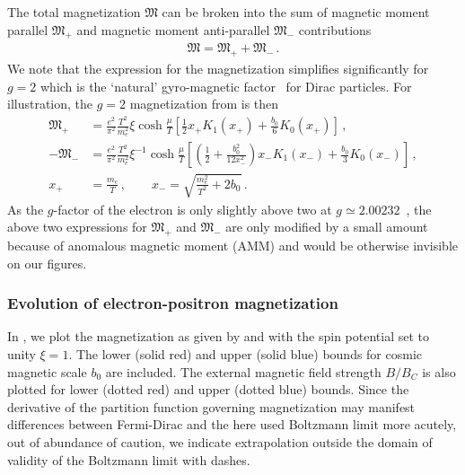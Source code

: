 The total magnetization ${\mathfrak M}$ can be broken into the sum of magnetic moment parallel ${\mathfrak M}_{+}$ and magnetic moment anti-parallel ${\mathfrak M}_{-}$ contributions
\begin{align}
\label{g2mag}
{\mathfrak M}={\mathfrak M}_{+}+{\mathfrak M}_{-}\,.
\end{align}
We note that the expression for the magnetization simplifies significantly for $g\!=\!2$ which is the `natural' gyro-magnetic factor~\cite{Evans:2022fsu,Rafelski:2022bsv} for Dirac particles. For illustration, the $g\!=\!2$ magnetization from  is then
\begin{align}
 \label{g2magplus}
 {\mathfrak M}_{+}&=\frac{e^{2}}{\pi^{2}}\frac{T^{2}}{m_{e}^{2}}\xi\cosh{\frac{\mu}{T}}\left[\frac{1}{2}x_{+}K_{1}(x_{+})+\frac{b_{0}}{6}K_{0}(x_{+})\right]\,,\\
 \label{g2magminus}
 -{\mathfrak M}_{-}&=\frac{e^{2}}{\pi^{2}}\frac{T^{2}}{m_{e}^{2}}\xi^{-1}\cosh{\frac{\mu}{T}}
 \left[\left(\frac{1}{2}+\frac{b_{0}^{2}}{12x_{-}^{2}}\right)x_{-}K_{1}(x_{-})+\frac{b_{0}}{3}K_{0}(x_{-})\right]\,,\\
 x_{+}&=\frac{m_{e}}{T}\,,\qquad
 x_{-}=\sqrt{\frac{m_{e}^{2}}{T^{2}}+2b_{0}}\,.
\end{align}
As the $g$-factor of the electron is only slightly above two at $g\simeq2.00232$~\cite{Tiesinga:2021myr}, the above two expressions for ${\mathfrak M}_{+}$ and ${\mathfrak M}_{-}$ are only modified by a small amount because of anomalous magnetic moment (AMM) and would be otherwise invisible on our figures.

\subsubsection{Evolution of electron-positron magnetization}
\label{sec:paramagnetism}
\noindent In , we plot the magnetization as given by  and  with the spin potential set to unity $\xi=1$. The lower (solid red) and upper (solid blue) bounds for cosmic magnetic scale $b_{0}$ are included. The external magnetic field strength ${B}/{B}_{C}$ is also plotted for lower (dotted red) and upper (dotted blue) bounds. Since the derivative of the partition function governing magnetization may manifest differences between Fermi-Dirac and the here used Boltzmann limit more acutely, out of abundance of caution, we indicate extrapolation outside the domain of validity of the Boltzmann limit with dashes.

